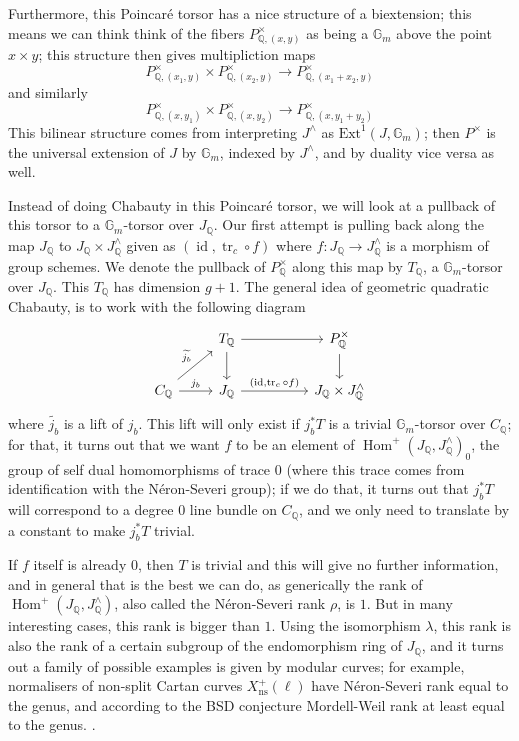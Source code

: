 \documentclass[12pt]{article}
\renewcommand{\G}{\mathbb{G}}
\newcommand{\Q}{\mathbb{Q}}
\DeclareMathOperator{\Hom}{Hom}
\DeclareMathOperator{\id}{id}
\DeclareMathOperator{\tr}{tr}
\theoremstyle{plain}
\theoremstyle{definition}
\theoremstyle{remark}
\begin{document}
Furthermore, this Poincar\'e torsor has a nice structure of a biextension; this means we can think think of the fibers $P^\times_{\Q,(x,y)}$ as being a $\G_m$ above the point $x \times y$; this structure then gives multipliction maps \[P^\times_{\Q,(x_1,y)} \times P^\times_{\Q,(x_2,y)} \to P^\times_{\Q,(x_1+x_2,y)}\] and similarly \[P^\times_{\Q,(x,y_1)} \times P^\times_{\Q,(x,y_2)} \to P^\times_{\Q,(x,y_1+y_2)}\]
This bilinear structure comes from interpreting $J^\wedge$ as $\text{Ext}^1(J,\G_m)$; then $P^\times$ is the universal extension of $J$ by $\G_m$, indexed by $J^\wedge$, and by duality vice versa as well.

Instead of doing Chabauty in this Poincar\'e torsor, we will look at a pullback of this torsor to a $\G_m$-torsor over $J_\Q$. Our first attempt is pulling back along the map $J_\Q$ to $J_\Q \times J^\wedge_\Q$ given as $(\id,\tr_c \circ f)$ where $f: J_\Q \to J^\wedge_\Q$ is a morphism of group schemes. We denote the pullback of $P^\times_\Q$ along this map by $T_\Q$, a $\G_m$-torsor over $J_\Q$. This $T_\Q$ has dimension $g+1$. The general idea of geometric quadratic Chabauty, is to work with the following diagram
\[\begin{tikzcd} %
                                                & T_\Q \arrow[d] \arrow[rr]                   && P_\Q^\times \arrow[d]      \\
C_\Q \arrow[ru, "\widetilde{j_b}"] \arrow[r, "j_b"] & J_\Q \arrow[rr, "{(\id,\tr_c \circ f)}"] && J_\Q \times J^\wedge_\Q
\end{tikzcd}\]
where $\widetilde{j_b}$ is a lift of $j_b$. This lift will only exist if $j_b^* T$ is a trivial $\G_m$-torsor over $C_\Q$; for that, it turns out that we want $f$ to be an element of $\Hom^+(J_\Q,J^\wedge_\Q)_0$, the group of self dual homomorphisms of trace $0$ (where this trace comes from identification with the N\'eron-Severi group); if we do that, it turns out that $j_b^* T$ will correspond to a degree $0$ line bundle on $C_\Q$, and we only need to translate by a constant to make $j_b^* T$ trivial.

If $f$ itself is already $0$, then $T$ is trivial and this will give no further information, and in general that is the best we can do, as generically the rank of $\Hom^+(J_\Q,J^\wedge_\Q)$, also called the N\'eron-Severi rank $\rho$, is $1$. But in many interesting cases, this rank is bigger than $1$. Using the isomorphism $\lambda$, this rank is also the rank of a certain subgroup of the endomorphism ring of $J_\Q$, and it turns out a family of possible examples is given by modular curves; for example, normalisers of non-split Cartan curves $X_{\text{ns}}^+(\ell)$ have N\'eron-Severi rank equal to the genus, and according to the BSD conjecture Mordell-Weil rank at least equal to the genus. .
\end{document}
